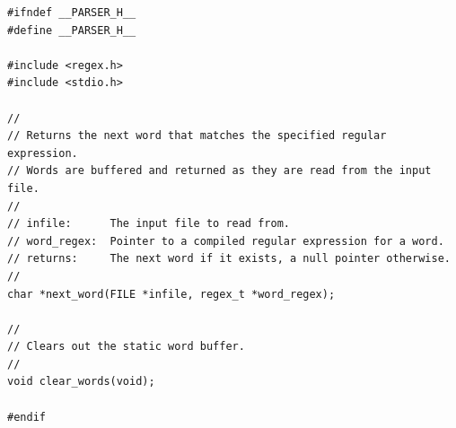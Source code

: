 \documentclass{article}
\begin{document}
\begin{lstlisting}[title=parser.h]
#ifndef __PARSER_H__
#define __PARSER_H__

#include <regex.h>
#include <stdio.h>

//
// Returns the next word that matches the specified regular expression.
// Words are buffered and returned as they are read from the input file.
//
// infile:      The input file to read from.
// word_regex:  Pointer to a compiled regular expression for a word.
// returns:     The next word if it exists, a null pointer otherwise.
//
char *next_word(FILE *infile, regex_t *word_regex);

//
// Clears out the static word buffer.
//
void clear_words(void);

#endif
\end{lstlisting}
\end{document}
